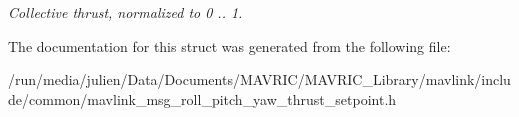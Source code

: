 \begin{DoxyCompactItemize}
\begin{DoxyCompactList}\small\item\em Collective thrust, normalized to 0 .. 1. \end{DoxyCompactList}\end{DoxyCompactItemize}


The documentation for this struct was generated from the following file\+:\begin{DoxyCompactItemize}
\item 
/run/media/julien/\+Data/\+Documents/\+M\+A\+V\+R\+I\+C/\+M\+A\+V\+R\+I\+C\+\_\+\+Library/mavlink/include/common/mavlink\+\_\+msg\+\_\+roll\+\_\+pitch\+\_\+yaw\+\_\+thrust\+\_\+setpoint.\+h\end{DoxyCompactItemize}
